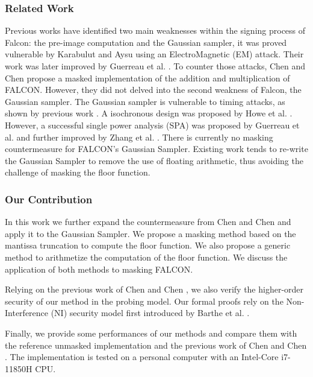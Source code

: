 \documentclass[runningheads]{llncs}
\begin{document}
\subsubsection{Related Work} Previous works have identified two main weaknesses within the signing process of Falcon: the pre-image computation and the Gaussian sampler, it was proved vulnerable by Karabulut and Aysu \cite{9586131} using an ElectroMagnetic (EM) attack. Their work was later improved by Guerreau et al. \cite{Guerreau_Martinelli_Ricosset_Rossi_2022}. To counter those attacks, Chen and Chen \cite{Chen_Chen_2024} propose a masked implementation of the addition and multiplication of FALCON. However, they did not delved into the second weakness of Falcon, the Gaussian sampler.\newline
The Gaussian sampler is vulnerable to timing attacks, as shown by
previous work
\cite{10.1007/978-3-662-53140-2_16,10.1145/3133956.3134028,cryptoeprint:2019/478,10.1145/3133956.3134023}. A
isochronous design was proposed by Howe et
al. \cite{10.1007/978-3-030-44223-1_4}. However, a successful single
power analysis (SPA) was proposed by Guerreau et
al. \cite{Guerreau_Martinelli_Ricosset_Rossi_2022} and further
improved by Zhang et al. \cite{10.1007/978-3-031-30634-1_19}. There is
currently no masking countermeasure for FALCON's Gaussian
Sampler. Existing work \cite{10.1007/978-3-031-07082-2_9} tends to
re-write the Gaussian Sampler to remove the use of floating
arithmetic, thus avoiding the challenge of masking the floor function.
%
\subsubsection{Our Contribution}
In this work we further expand the countermeasure from Chen and Chen \cite{Chen_Chen_2024} and apply it to the Gaussian Sampler. We propose a masking method based on the mantissa truncation to compute the floor function. We also propose a generic method to arithmetize the computation of the floor function. We discuss the application of both methods to masking FALCON.

\medskip

Relying on the previous work of Chen and Chen \cite{Chen_Chen_2024}, we also verify the higher-order security of our method in the probing model. Our formal proofs rely on the Non-Interference (NI) security model first introduced by Barthe et al. \cite{barthe2016strong}.

\medskip

Finally, we provide some performances of our methods and compare them with the reference unmasked implementation and the previous work of Chen and Chen \cite{Chen_Chen_2024}. The implementation is tested on a personal computer with an Intel-Core i7-11850H CPU.
%
\end{document}
